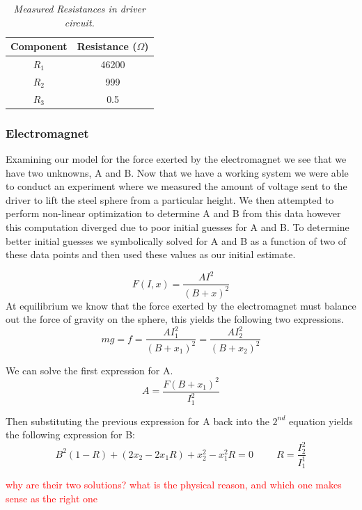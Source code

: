 \documentclass{article}
\newcommand{\xxx}[1]{\textcolor{red}{#1}}
\theoremstyle{plain}
\theoremstyle{definition}
\theoremstyle{remark}
\begin{document}
\begin{table}
\begin{center}
    \begin{tabular}{|c|c|}
        \hline
        Component & Resistance ($\Omega$) \\ \hline
        $R_{1}$   & 46200                 \\ 
        $R_{2}$   & 999                   \\ 
        $R_{3}$   & 0.5                   \\
        \hline
    \end{tabular}
\end{center}
\caption{\emph{Measured Resistances in driver circuit.}}
\label{Q1_dt1}
\end{table}

\subsubsection*{Electromagnet}
Examining our model for the force exerted by the electromagnet we see that we have two unknowns, A and B.  Now that we have a working system we were able to conduct an experiment where we measured the amount of voltage sent to the driver to lift the steel sphere from a particular height.  We then attempted to perform non-linear optimization to determine A and B from this data however this computation diverged due to poor initial guesses for A and B.  To determine better initial guesses we symbolically solved for A and B as a function of two of these data points and then used these values as our initial estimate.  

$$ F(I,x) = \frac{A I^2}{(B+x)^2} $$
At equilibrium we know that the force exerted by the electromagnet must balance out the force of gravity on the sphere, this yields the following two expressions.
$$ mg = f = \frac{A I_{1}^2}{(B+x_{1})^2}  = \frac{A I_{2}^2}{(B+x_{2})^2} $$ 

We can solve the first expression for A.
$$ A = \frac{F (B + x_{1})^2}{I_{1}^2}$$

Then substituting the previous expression for A back into the $2^{nd}$ equation yields the following expression for B:
$$ B^2(1-R) + (2x_2-2x_1R)+x_2^2-x_1^2R = 0 \hspace{1cm} R = \frac{I_2^2}{I_1^1} $$

\xxx{why are their two solutions? what is the physical reason, and which one makes sense as the right one}
\end{document}
